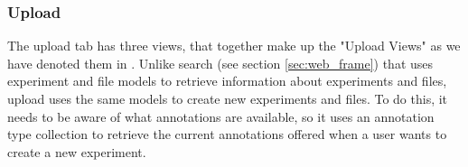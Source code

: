 \subsubsection{Upload}
The upload tab has three views, that together make up the "Upload Views" as we have denoted them in . Unlike search (see section \ref{sec:web_frame}) that uses experiment and file models to retrieve information about experiments and files, upload uses the same models to create new experiments and files. To do this, it needs to be aware of what annotations are available, so it uses an annotation type collection to retrieve the current annotations offered when a user wants to create a new experiment.